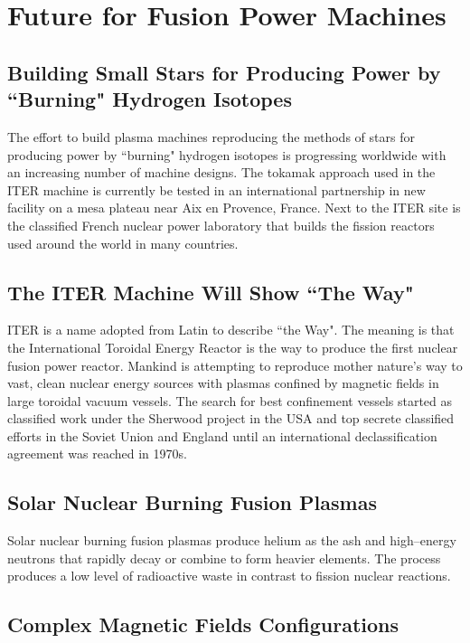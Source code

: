 \documentclass[a4paper,openany,12pt]{book}
\begin{document}
\chapter{Future for Fusion Power Machines}

\section{Building Small Stars for Producing Power by ``Burning" Hydrogen Isotopes}

The effort to build plasma machines reproducing the methods of stars for producing power by ``burning" hydrogen isotopes is progressing worldwide with an increasing number of machine designs. The tokamak approach used in the ITER machine is currently be tested in an international partnership in new facility on a mesa plateau near Aix en Provence, France. Next to the ITER site is the classified French nuclear power laboratory that builds the fission reactors used around the world in many countries.

\section{The ITER Machine Will Show ``The Way"}

ITER is a name adopted from Latin to describe ``the Way". The meaning is that the International Toroidal Energy Reactor is the way to produce the first nuclear fusion power reactor. Mankind is attempting to reproduce mother nature's way to vast, clean nuclear energy sources with plasmas confined by magnetic fields in large toroidal vacuum vessels. The search for best confinement vessels started as classified work under the Sherwood project in the USA and top secrete classified efforts in the Soviet Union and England until an international declassification agreement was reached in 1970s.

\section{Solar Nuclear Burning Fusion Plasmas}

Solar nuclear burning fusion plasmas produce helium as the ash and high--energy neutrons that rapidly decay or combine to form heavier elements. The process produces a low level of radioactive waste in contrast to fission nuclear reactions.

\section{Complex Magnetic Fields Configurations}
\end{document}
